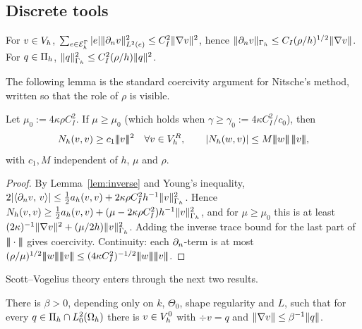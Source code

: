 \subsection{Discrete tools}
\begin{lemma}\label{lem:inverse}
For $v\in V_h$, $\sum_{e\in\mathcal E_h^\Gamma}|e|\lVert \partial_n v\rVert^2_{L^2(e)}\le C_I^2\lVert \nabla v\rVert^2$, hence $\lVert \partial_n v\rVert_{\Gamma_h}\le C_I(\rho/h)^{1/2}\lVert \nabla v\rVert$. For $q\in\Pi_h$, $\lVert q\rVert^2_{\Gamma_h}\le C_I^2(\rho/h)\lVert q\rVert^2$.
\end{lemma}

The following lemma is the standard coercivity argument for Nitsche's method, written so that the role of $\rho$ is visible.

\begin{lemma}\label{lem:coercive}
Let $\mu_0:=4\kappa\rho C_I^2$. If $\mu\ge\mu_0$ (which holds when $\gamma\ge\gamma_0:=4\kappa C_I^2/c_0$), then
\[
N_h(v,v)\ge c_1\tnorm{v}^2\quad\forall v\in\VR,\qquad |N_h(w,v)|\le M\tnorm{w}\,\tnorm{v},
\]
with $c_1,M$ independent of $h$, $\mu$ and $\rho$.
\end{lemma}

\begin{proof}
By Lemma~\ref{lem:inverse} and Young's inequality, $2|\langle \partial_n v,\, v\rangle|\le\frac12a_h(v,v)+2\kappa\rho C_I^2h^{-1}\lVert v\rVert^2_{\Gamma_h}$. Hence $N_h(v,v)\ge\frac12a_h(v,v)+(\mu-2\kappa\rho C_I^2)h^{-1}\lVert v\rVert^2_{\Gamma_h}$, and for $\mu\ge\mu_0$ this is at least $(2\kappa)^{-1}\lVert \nabla v\rVert^2+(\mu/2h)\lVert v\rVert^2_{\Gamma_h}$. Adding the inverse trace bound for the last part of $|\!|\!|\cdot|\!|\!|$ gives coercivity. Continuity: each $\partial_n$-term is at most $(\rho/\mu)^{1/2}\tnorm w\tnorm v\le(4\kappa C_I^2)^{-1/2}\tnorm w\tnorm v$.
\end{proof}

Scott--Vogelius theory enters through the next two results.

\begin{lemma}\label{lem:infsup}
There is $\beta>0$, depending only on $k$, $\Theta_0$, shape regularity and $L$, such that for every $q\in\Pi_h\cap L^2_0(\Omega_h)$ there is $v\in V_h^0$ with $\div v=q$ and $\lVert \nabla v\rVert\le\beta^{-1}\lVert q\rVert$.
\end{lemma}

